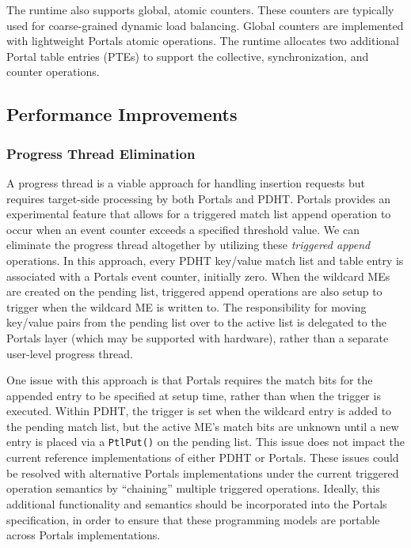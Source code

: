The runtime also supports global, atomic counters. These counters are typically
used for coarse-grained dynamic load balancing. Global counters are implemented
with lightweight Portals atomic operations. The runtime allocates two
additional Portal table entries (PTEs) to support the collective,
synchronization, and counter operations. 

\subsection{Performance Improvements}
\label{sec:ptl-ext}

\subsubsection{Progress Thread Elimination}
A progress thread is a viable
approach for handling insertion requests but requires target-side processing
by both Portals and PDHT. Portals provides an experimental feature that allows
for a triggered match list append operation to occur when an event counter
exceeds a specified threshold value. We can eliminate the progress thread
altogether by utilizing these {\em triggered append} operations. In this
approach, every PDHT key/value match list and table entry is associated with a
Portals event counter, initially zero.  When the wildcard MEs are created on
the pending list, triggered append operations are also setup to trigger when
the wildcard ME is written to. The responsibility for moving key/value pairs
from the pending list over to the active list is delegated to the Portals layer
(which may be supported with hardware), rather than a separate user-level
progress thread. 

One issue with this approach is that Portals requires the match bits for the
appended entry to be specified at setup time, rather than when the trigger is
executed. Within PDHT, the trigger is set when the wildcard entry is added to
the pending match list, but the active ME's match bits are unknown until a new
entry is placed via a {\tt PtlPut()} on the pending list. This issue does not
impact the current reference implementations of either PDHT or Portals. These
issues could be resolved with alternative Portals implementations under the
current triggered operation semantics by ``chaining'' multiple triggered
operations. Ideally, this additional functionality and semantics should be
incorporated into the Portals specification, in order to ensure that these
programming models are portable across Portals implementations.

